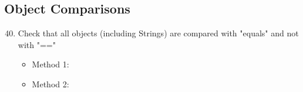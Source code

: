 \subsection{Object Comparisons}
\begin{enumerate}
\setcounter{enumi}{39}
	\item  Check that all objects (including Strings) are compared with "equals" and not with "=="
	\begin{itemize}
		\item Method 1: \cmark
		\item Method 2: \cmark
	\end{itemize}
\end{enumerate}